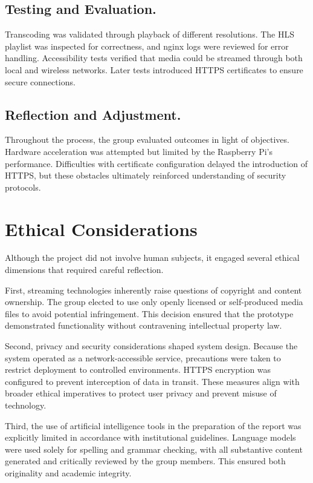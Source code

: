 \documentclass[11pt]{report}
\begin{document}
\section{Testing and Evaluation.} Transcoding was validated through playback of different resolutions. The HLS playlist was inspected for correctness, and nginx logs were reviewed for error handling. Accessibility tests verified that media could be streamed through both local and wireless networks. Later tests introduced HTTPS certificates to ensure secure connections.

\section{Reflection and Adjustment.} Throughout the process, the group evaluated outcomes in light of objectives. Hardware acceleration was attempted but limited by the Raspberry Pi’s performance. Difficulties with certificate configuration delayed the introduction of HTTPS, but these obstacles ultimately reinforced understanding of security protocols.

\chapter{Ethical Considerations}
Although the project did not involve human subjects, it engaged several ethical dimensions that required careful reflection.

First, streaming technologies inherently raise questions of copyright and content ownership. The group elected to use only openly licensed or self-produced media files to avoid potential infringement. This decision ensured that the prototype demonstrated functionality without contravening intellectual property law.

Second, privacy and security considerations shaped system design. Because the system operated as a network-accessible service, precautions were taken to restrict deployment to controlled environments. HTTPS encryption was configured to prevent interception of data in transit. These measures align with broader ethical imperatives to protect user privacy and prevent misuse of technology.

Third, the use of artificial intelligence tools in the preparation of the report was explicitly limited in accordance with institutional guidelines. Language models were used solely for spelling and grammar checking, with all substantive content generated and critically reviewed by the group members. This ensured both originality and academic integrity.
\end{document}
